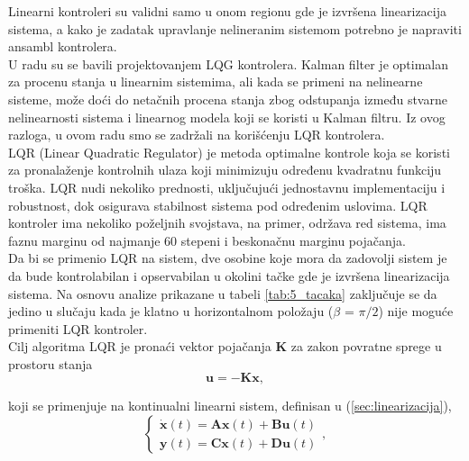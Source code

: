 \documentclass[a4paper,11pt]{article}
\theoremstyle{definition} \newtheorem{deff}{Definicija}[section]
\theoremstyle{definition} \newtheorem{prim}[deff]{Primer}
\theoremstyle{plain} \newtheorem{teor}[deff]{Teorema}
\newcommand{\vect}[1]{\boldsymbol{\mathbf{#1}}}
\begin{document}
	Linearni kontroleri su validni samo u onom regionu gde je izvršena linearizacija sistema, a kako je zadatak upravlanje nelineranim sistemom potrebno je napraviti ansambl kontrolera. \\
	
	U radu \cite{inicijalna} su se bavili projektovanjem LQG kontrolera. Kalman filter je optimalan za procenu stanja u linearnim sistemima, ali kada se primeni na nelinearne sisteme, može doći do netačnih procena stanja zbog odstupanja između stvarne nelinearnosti sistema i linearnog modela koji se koristi u Kalman filtru. Iz ovog razloga, u ovom radu smo se zadržali na korišćenju LQR kontrolera. \\
	
	LQR (Linear Quadratic Regulator) je metoda optimalne kontrole koja se koristi za pronalaženje kontrolnih ulaza koji minimizuju određenu kvadratnu funkciju troška. LQR nudi nekoliko prednosti, uključujući jednostavnu implementaciju i robustnost, dok osigurava stabilnost sistema pod određenim uslovima. LQR kontroler ima nekoliko poželjnih svojstava, na primer, održava red sistema, ima faznu marginu od najmanje 60 stepeni i beskonačnu marginu pojačanja.\\
	
	Da bi se primenio LQR na sistem, dve osobine koje mora da zadovolji sistem je da bude kontrolabilan i opservabilan u okolini tačke gde je izvršena linearizacija sistema. Na osnovu analize prikazane u tabeli \ref{tab:5_tacaka} zaključuje se da jedino u slučaju kada je klatno u horizontalnom položaju ($\beta$ = $\pi /2$) nije moguće primeniti LQR kontroler.\\
	
	
	Cilj algoritma LQR je pronaći vektor pojačanja $\vect{K}$ za zakon povratne sprege u prostoru stanja
	\begin{equation}
		\vect{u} = -\vect{K}\vect{x}, 
	\end{equation}
	
	koji se primenjuje na kontinualni linearni sistem, definisan u (\ref{sec:linearizacija}), \\
	
	\begin{equation}
		\begin{cases}
			\dot{\vect{x}}(t) = \vect{A}\vect{x}(t) + \vect{B}\vect{u}(t) \\
			\vect{y}(t) = \vect{C}\vect{x}(t) + \vect{D}\vect{u}(t)
		\end{cases}, 
	\end{equation}\\
	
\end{document}

